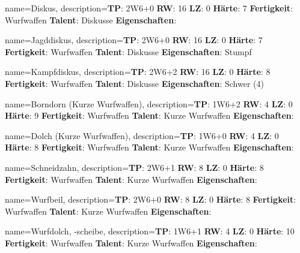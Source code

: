 {
    name={Diskus},
    description={\textbf{TP}: 2W6+0 \textbf{RW}: 16 \textbf{LZ}: 0 \textbf{Härte}: 7        \textbf{Fertigkeit}: Wurfwaffen \textbf{Talent}: Diskusse \textbf{{Eigenschaften}}: }
}



{
    name={Jagddiskus},
    description={\textbf{TP}: 2W6+0 \textbf{RW}: 16 \textbf{LZ}: 0 \textbf{Härte}: 7        \textbf{Fertigkeit}: Wurfwaffen \textbf{Talent}: Diskusse \textbf{{Eigenschaften}}: Stumpf}
}



{
    name={Kampfdiskus},
    description={\textbf{TP}: 2W6+2 \textbf{RW}: 16 \textbf{LZ}: 0 \textbf{Härte}: 8        \textbf{Fertigkeit}: Wurfwaffen \textbf{Talent}: Diskusse \textbf{{Eigenschaften}}: Schwer (4)}
}



{
    name={Borndorn (Kurze Wurfwaffen)},
    description={\textbf{TP}: 1W6+2 \textbf{RW}: 4 \textbf{LZ}: 0 \textbf{Härte}: 9        \textbf{Fertigkeit}: Wurfwaffen \textbf{Talent}: Kurze Wurfwaffen \textbf{{Eigenschaften}}: }
}



{
    name={Dolch (Kurze Wurfwaffen)},
    description={\textbf{TP}: 1W6+0 \textbf{RW}: 4 \textbf{LZ}: 0 \textbf{Härte}: 8        \textbf{Fertigkeit}: Wurfwaffen \textbf{Talent}: Kurze Wurfwaffen \textbf{{Eigenschaften}}: }
}



{
    name={Schneidzahn},
    description={\textbf{TP}: 2W6+1 \textbf{RW}: 8 \textbf{LZ}: 0 \textbf{Härte}: 8        \textbf{Fertigkeit}: Wurfwaffen \textbf{Talent}: Kurze Wurfwaffen \textbf{{Eigenschaften}}: }
}



{
    name={Wurfbeil},
    description={\textbf{TP}: 2W6+0 \textbf{RW}: 8 \textbf{LZ}: 0 \textbf{Härte}: 8        \textbf{Fertigkeit}: Wurfwaffen \textbf{Talent}: Kurze Wurfwaffen \textbf{{Eigenschaften}}: }
}



{
    name={Wurfdolch, -scheibe},
    description={\textbf{TP}: 1W6+1 \textbf{RW}: 4 \textbf{LZ}: 0 \textbf{Härte}: 10        \textbf{Fertigkeit}: Wurfwaffen \textbf{Talent}: Kurze Wurfwaffen \textbf{{Eigenschaften}}: }
}



